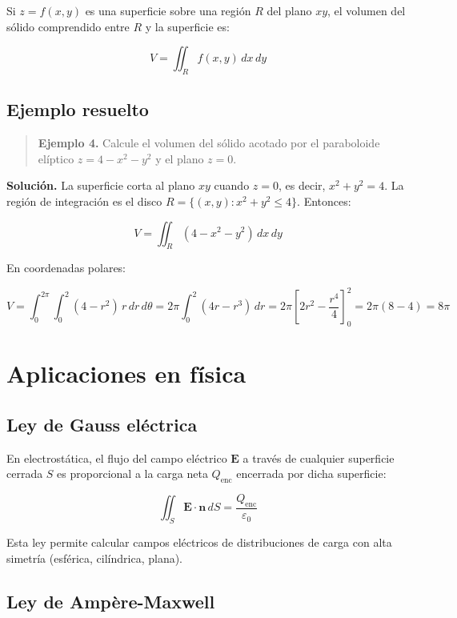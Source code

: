 \documentclass[
]{book}
\begin{document}
Si \(z = f(x, y)\) es una superficie sobre una región \(R\) del plano \(xy\), el volumen del sólido comprendido entre \(R\) y la superficie es:

\[
V = \iint_R f(x, y) \, dx\, dy
\]

\subsection{Ejemplo resuelto}\label{ejemplo-resuelto-26}

\begin{quote}
\textbf{Ejemplo 4.} Calcule el volumen del sólido acotado por el paraboloide elíptico \(z = 4 - x^2 - y^2\) y el plano \(z = 0\).
\end{quote}

\textbf{Solución.} La superficie corta al plano \(xy\) cuando \(z = 0\), es decir, \(x^2 + y^2 = 4\). La región de integración es el disco \(R = \{(x, y) : x^2 + y^2 \leq 4\}\). Entonces:

\[
V = \iint_R (4 - x^2 - y^2) \, dx\, dy
\]

En coordenadas polares:

\[
V = \int_0^{2\pi} \int_0^2 (4 - r^2) \, r\,dr\,d\theta = 2\pi \int_0^2 (4r - r^3) \, dr = 2\pi \left[ 2r^2 - \frac{r^4}{4} \right]_0^2 = 2\pi (8 - 4) = 8\pi
\]

\section{Aplicaciones en física}\label{aplicaciones-en-fuxedsica}

\subsection{Ley de Gauss eléctrica}\label{ley-de-gauss-eluxe9ctrica}

En electrostática, el flujo del campo eléctrico \(\mathbf{E}\) a través de cualquier superficie cerrada \(S\) es proporcional a la carga neta \(Q_{\text{enc}}\) encerrada por dicha superficie:

\[
\iint_S \mathbf{E} \cdot \mathbf{n} \, dS = \frac{Q_{\text{enc}}}{\varepsilon_0}
\]

Esta ley permite calcular campos eléctricos de distribuciones de carga con alta simetría (esférica, cilíndrica, plana).

\subsection{Ley de Ampère-Maxwell}\label{ley-de-ampuxe8re-maxwell}
\end{document}
